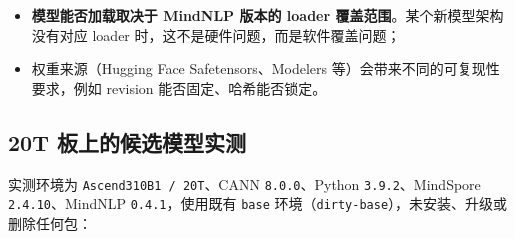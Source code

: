 \begin{itemize}
\tightlist
\item
  \textbf{模型能否加载取决于 MindNLP 版本的 loader
  覆盖范围}。某个新模型架构没有对应 loader
  时，这不是硬件问题，而是软件覆盖问题；
\item
  权重来源（Hugging Face Safetensors、Modelers
  等）会带来不同的可复现性要求，例如 revision 能否固定、哈希能否锁定。
\end{itemize}

\subsection{20T 板上的候选模型实测}\label{src-book-chapter5-h30}

实测环境为 \passthrough{\lstinline!Ascend310B1 / 20T!}、CANN
\passthrough{\lstinline!8.0.0!}、Python
\passthrough{\lstinline!3.9.2!}、MindSpore
\passthrough{\lstinline!2.4.10!}、MindNLP
\passthrough{\lstinline!0.4.1!}，使用既有 \passthrough{\lstinline!base!}
环境（\passthrough{\lstinline!dirty-base!}），未安装、升级或删除任何包：

